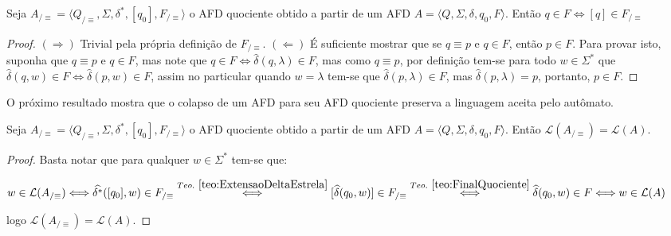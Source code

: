 \begin{theorem}\label{teo:FinalQuociente}
	Seja  $A_{/\equiv} = \langle Q_{/\equiv}, \Sigma, \delta^*, [q_0],  F_{/\equiv}\rangle$ o AFD quociente obtido a partir de um AFD $A = \langle Q, \Sigma, \delta, q_0, F\rangle$. Então $q \in F \Longleftrightarrow [q] \in F_{/\equiv}$
\end{theorem}

\begin{proof}
	$(\Rightarrow)$ Trivial pela própria definição de $ F_{/\equiv}$. $(\Leftarrow)$ É suficiente mostrar que se $q \equiv p$ e $q \in F$, então $p \in F$. Para provar isto, suponha que $q \equiv p$ e $q \in F$, mas note que $q \in F \Longleftrightarrow \widehat{\delta}(q, \lambda) \in F$, mas como $q \equiv p$, por definição tem-se para todo $w \in \Sigma^*$ que $\widehat{\delta}(q, w) \in F \Longleftrightarrow \widehat{\delta}(p, w) \in F$, assim no particular quando $w = \lambda$ tem-se que  $\widehat{\delta}(p, \lambda) \in F$, mas $\widehat{\delta}(p, \lambda) = p$, portanto, $p \in F$.
\end{proof}

O próximo resultado mostra que o colapso de um AFD para seu AFD quociente preserva a linguagem aceita pelo autômato. 

\begin{theorem}\label{teo:LinguagemQuociente}
	Seja  $A_{/\equiv} = \langle Q_{/\equiv}, \Sigma, \delta^*, [q_0],  F_{/\equiv}\rangle$ o AFD quociente obtido a partir de um AFD $A = \langle Q, \Sigma, \delta, q_0, F\rangle$. Então $\mathcal{L}(A_{/\equiv}) = \mathcal{L}(A)$.
\end{theorem}

\begin{proof}
	Basta notar que para qualquer $w \in \Sigma^*$ tem-se que:
	
	$w \in \mathcal{L}(A_{/\equiv}) \Longleftrightarrow \widehat{\delta^*}([q_0], w) \in F_{/\equiv} \stackrel{Teo. \ \ref{teo:ExtensaoDeltaEstrela}}{\Longleftrightarrow} [\widehat{\delta}(q_0, w)] \in F_{/\equiv} \stackrel{Teo. \ \ref{teo:FinalQuociente}}{\Longleftrightarrow} \widehat{\delta}(q_0, w) \in F \Longleftrightarrow w \in \mathcal{L}(A) $
	
	\noindent logo $\mathcal{L}(A_{/\equiv}) = \mathcal{L}(A)$.
\end{proof}

\

